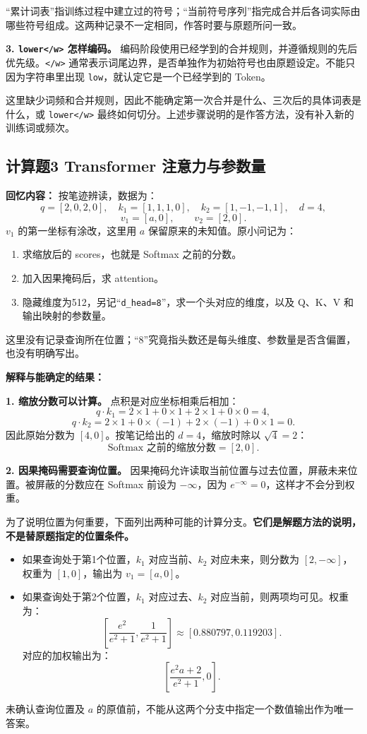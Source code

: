 \documentclass[UTF8,a4paper,zihao=-4,fontset=windows]{ctexart}
\newcommand{\recalled}[1]{\Needspace{8\baselineskip}\subsection*{#1}}
\begin{document}
“累计词表”指训练过程中建立过的符号；“当前符号序列”指完成合并后各词实际由哪些符号组成。这两种记录不一定相同，作答时要与原题所问一致。

\textbf{3. \texttt{lower</w>} 怎样编码。}
编码阶段使用已经学到的合并规则，并遵循规则的先后优先级。\texttt{</w>} 通常表示词尾边界，是否单独作为初始符号也由原题设定。不能只因为字符串里出现 \texttt{low}，就认定它是一个已经学到的 Token。

这里缺少词频和合并规则，因此不能确定第一次合并是什么、三次后的具体词表是什么，或 \texttt{lower</w>} 最终如何切分。上述步骤说明的是作答方法，没有补入新的训练词或频次。

\recalled{计算题3 Transformer 注意力与参数量}

\textbf{回忆内容：}
按笔迹辨读，数据为：
\[
q=[2,0,2,0],\quad k_1=[1,1,1,0],\quad k_2=[1,-1,-1,1],\quad d=4,
\]
\[
v_1=[a,0],\qquad v_2=[2,0].
\]
$v_1$ 的第一坐标有涂改，这里用 $a$ 保留原来的未知值。原小问记为：
\begin{enumerate}[label=(\arabic*)]
\item {}求缩放后的 scores，也就是 Softmax 之前的分数。
\item {}加入因果掩码后，求 attention。
\item {}隐藏维度为512，另记“\texttt{d\_head=8}”，求一个头对应的维度，以及 Q、K、V 和输出映射的参数量。
\end{enumerate}
这里没有记录查询所在位置；“8”究竟指头数还是每头维度、参数量是否含偏置，也没有明确写出。

\textbf{解释与能确定的结果：}

\textbf{1. 缩放分数可以计算。}
点积是对应坐标相乘后相加：
\[
q\cdot k_1=2\times1+0\times1+2\times1+0\times0=4,
\]
\[
q\cdot k_2=2\times1+0\times(-1)+2\times(-1)+0\times1=0.
\]
因此原始分数为 $[4,0]$。按笔记给出的 $d=4$，缩放时除以 $\sqrt4=2$：
\[
\boxed{\text{Softmax 之前的缩放分数}=[2,0].}
\]

\textbf{2. 因果掩码需要查询位置。}
因果掩码允许读取当前位置与过去位置，屏蔽未来位置。被屏蔽的分数应在 Softmax 前设为 $-\infty$，因为 $e^{-\infty}=0$，这样才不会分到权重。

为了说明位置为何重要，下面列出两种可能的计算分支。\textbf{它们是解题方法的说明，不是替原题指定的位置条件。}
\begin{itemize}
\item {}如果查询处于第1个位置，$k_1$ 对应当前、$k_2$ 对应未来，则分数为 $[2,-\infty]$，权重为 $[1,0]$，输出为 $v_1=[a,0]$。
\item {}如果查询处于第2个位置，$k_1$ 对应过去、$k_2$ 对应当前，则两项均可见。权重为：
\[
\left[\frac{e^2}{e^2+1},\frac1{e^2+1}\right]
\approx[0.880797,0.119203].
\]
对应的加权输出为：
\[
\left[\frac{e^2a+2}{e^2+1},0\right].
\]
\end{itemize}
未确认查询位置及 $a$ 的原值前，不能从这两个分支中指定一个数值输出作为唯一答案。
\end{document}
